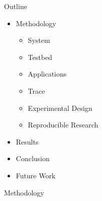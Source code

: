\documentclass{beamer}
\begin{document}
\begin{frame}{Outline}
\vfill
\Large
\begin{itemize}
\item Methodology
\begin{itemize}
\item System
\item Testbed
\item Applications
\item Trace
\item Experimental Design
\item Reproducible Research
\end{itemize}
\end{itemize}
\begin{itemize}
\item Results
\end{itemize}
\begin{itemize}
\item Conclusion
\item Future Work
\end{itemize}
\end{frame}

\begin{frame}  
\begin{block}{}
\begin{center}
\Huge{Methodology}
\end{center}
\end{block}
\end{frame}
\end{document}
